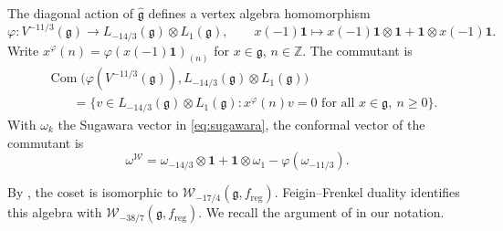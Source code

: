 \documentclass[11pt]{amsart}
\numberwithin{equation}{section}
\theoremstyle{definition}
\theoremstyle{remark}
\newcommand{\ZZ}{\mathbb Z}
\newcommand{\g}{\mathfrak g}
\newcommand{\one}{\mathbf1}
\newcommand{\W}{\mathcal W}
\newcommand{\Com}{\operatorname{Com}}
\newcommand{\reg}{\mathrm{reg}}
\begin{document}
The diagonal action of $\widehat{\g}$ defines a vertex algebra
homomorphism
\[
 \varphi:V^{-11/3}(\g)\longrightarrow
 L_{-14/3}(\g)\otimes L_1(\g),\qquad
 x(-1)\one\longmapsto x(-1)\one\otimes\one+
 \one\otimes x(-1)\one.
\]
Write $x^\varphi(n)=\varphi(x(-1)\one)_{(n)}$ for $x\in\g$, $n\in\ZZ$.
The commutant is
\begin{equation}\label{eq:coset-definition}
 \begin{aligned}
 &\Com\bigl(\varphi(V^{-11/3}(\g)),
 L_{-14/3}(\g)\otimes L_1(\g)\bigr)\\
 &\qquad=\{v\in L_{-14/3}(\g)\otimes L_1(\g):
x^\varphi(n)v=0\text{ for all }x\in\g,\ n\geq0\}.
 \end{aligned}
\end{equation}
With $\omega_k$ the Sugawara vector in \eqref{eq:sugawara}, the conformal vector of the commutant is
\begin{equation}\label{eq:coset-conformal}
 \omega^{\mathcal W}=\omega_{-14/3}\otimes\one+
 \one\otimes\omega_1-\varphi(\omega_{-11/3}).
\end{equation}

By \cite[Theorem~4.3]{ACK}, the coset is isomorphic to
$\W_{-17/4}(\g,f_{\reg})$. Feigin--Frenkel duality identifies this
algebra with $\W_{-38/7}(\g,f_{\reg})$. We recall the argument
of \cite{ACK} in our notation.
\end{document}
